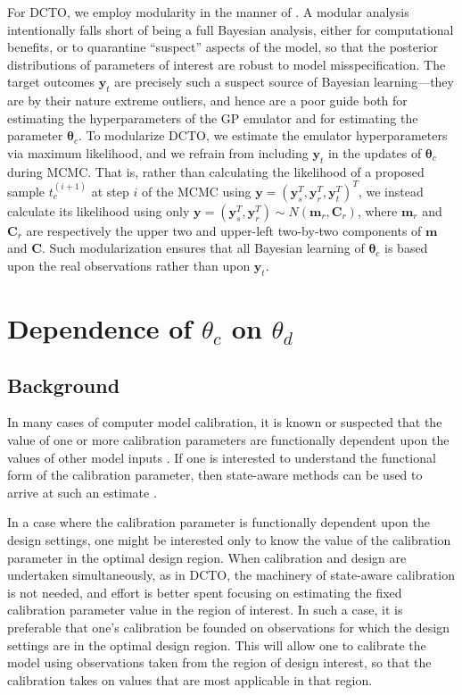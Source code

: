 \documentclass[10pt]{asme2ej}
\begin{document}
For DCTO, we employ modularity in the manner of \cite{Liu2009}. 
%
A modular analysis intentionally falls short of being a full Bayesian analysis, either for computational benefits, or to quarantine ``suspect'' aspects of the model, so that the posterior distributions of parameters of interest are robust to model misspecification.
%
The target outcomes $\mathbf y_t$ are precisely such a suspect source of Bayesian learning---they are by their nature extreme outliers, and hence are a poor guide both for estimating the hyperparameters of the GP emulator and for estimating the parameter $\boldsymbol\theta_c$.
%
To modularize DCTO, we estimate the emulator hyperparameters via maximum likelihood, and we refrain from including $\mathbf y_t$ in the updates of $\boldsymbol\theta_c$ during MCMC.
%
That is, rather than calculating the likelihood of a proposed sample $t_c^{(i+1)}$ at step $i$ of the MCMC using $\mathbf y = (\mathbf y_s^T, \mathbf y_r^T, \mathbf y_t^T)^T$, we instead calculate its likelihood using only $\mathbf y = (\mathbf y_s^T, \mathbf y_r^T)\sim N(\mathbf m_r,\mathbf C_r)$, where $\mathbf m_r$ and $\mathbf C_r$ are respectively the upper two and upper-left two-by-two components of $\mathbf m$ and $\mathbf C$.
%
Such modularization ensures that all Bayesian learning of $\boldsymbol\theta_c$ is based upon the real observations rather than upon $\mathbf y_t$.
%

%
\section{Dependence of $\theta_c$ on $\theta_d$}\label{sec:as}
\subsection{Background}
%
In many cases of computer model calibration, it is known or suspected that the value of one or more calibration parameters are functionally dependent upon the values of other model inputs \cite{Atamturktur2015,Atamturktur2017,Ezzat2018}.
%
If one is interested to understand the functional form of the calibration parameter, then state-aware methods can be used to arrive at such an estimate \cite{Atamturktur2015,Atamturktur2017,Brown2018}.
%

%
In a case where the calibration parameter is functionally dependent upon the design settings, one might be interested only to know the value of the calibration parameter in the optimal design region.
%
When calibration and design are undertaken simultaneously, as in DCTO, the machinery of state-aware calibration is not needed, and effort is better spent focusing on estimating the fixed calibration parameter value in the region of interest.
%
In such a case, it is preferable that one's calibration be founded on observations for which the design settings are in the optimal design region.
%
This will allow one to calibrate the model using observations taken from the region of design interest, so that the calibration takes on values that are most applicable in that region.
%
\end{document}
